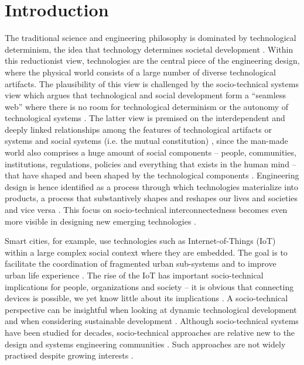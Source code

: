 \section{Introduction}
\label{sec:intro}

The traditional science and engineering philosophy is dominated by technological determinism, the idea that technology determines societal development \cite{Mody2006,Sawyer2014,Smith1994}. Within this reductionist view, technologies are the central piece of the engineering design, where the physical world consists of a large number of diverse technological artifacts. 
The plausibility of this view is challenged by the socio-technical systems view \cite{VanDam2012} which argues that technological and social development form a ``seamless web'' where there is no room for technological determinism or the autonomy of technological systems \cite{Fleischhacker2004}. 
%
The latter view is premised on the interdependent and deeply linked relationships among the features of technological artifacts or systems and social systems (i.e. the mutual constitution) \cite{Sawyer2014}, since the man-made world also comprises a huge amount of social components -- people, communities, institutions, regulations, policies and everything that exists in the human mind -- that have shaped and been shaped by the technological components \cite{Harari2014,VanDam2012}. 
Engineering design is hence identified as a process through which technologies materialize into products, a process that substantively  shapes  and  reshapes  our  lives  and   societies and vice versa \cite{Kroes2008}. This focus on socio-technical interconnectedness becomes even  more  visible in designing new emerging technologies \cite{Kroes2008}.  

Smart cities, for example, use technologies such as Internet-of-Things (IoT) within a large complex social context where they are embedded. The goal is to facilitate the coordination of fragmented urban sub-systems and to improve urban  life experience \cite{Glasmeier2015}. 
% 
The rise of the IoT has important socio-technical implications for people, organizations and society -- it is obvious that connecting devices is possible, we yet know little about its implications \cite{Shin2014}. A socio-technical perspective can be insightful when looking at dynamic technological development and when considering sustainable development \cite{Shin2014}. Although socio-technical systems have been studied for decades, socio-technical approaches are relative new to the design and systems engineering communities \cite{Baxter2011,Norman2015,Sawyer2014}. Such approaches are not widely practised despite growing interests \cite{Baxter2011}. %

